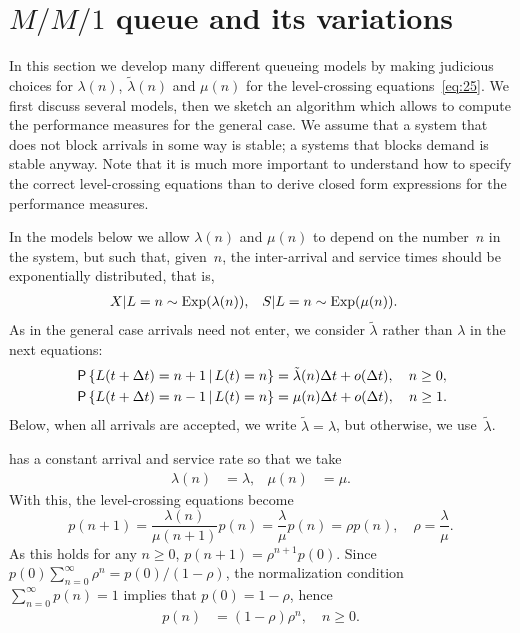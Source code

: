 \documentclass[stochastic-or.tex]{subfiles}
\begin{document}
\section{\texorpdfstring{$M/M/1$}{MM1} queue and its variations}
\label{sec:mm1}


In this section we develop many different queueing models by making judicious choices for $\lambda(n)$, $\tilde \lambda(n)$ and $\mu(n)$ for the level-crossing equations~\cref{eq:25}.
We first discuss several models, then we sketch an algorithm which allows to compute the performance measures for the general case.
We assume that a system that does not block arrivals in some way is stable; a systems that blocks demand is stable anyway.
Note that it is much more important to understand how to specify the correct level-crossing equations than to derive closed form expressions for the performance measures.

In the models below we allow $\lambda(n)$ and $\mu(n)$ to depend on the number~$n$ in the system, but such that, given~$n$, the inter-arrival and service times should be exponentially distributed, that is,
\begin{align*}
  X|L=n &\sim \mathrm{Exp}(\lambda(n)), & S|L=n &\sim \mathrm{Exp}(\mu(n)).
\end{align*}
As  in the general case arrivals need not enter, we consider $\tilde \lambda$ rather than $\lambda$ in the next equations:
\begin{align*}
  \,\mathsf{P}\left\{L(t+\Delta t) = n+1 \,\middle|\, L(t) = n \right\} &= \tilde \lambda(n) \Delta t + o(\Delta t), \quad n\geq 0,\\
  \,\mathsf{P}\left\{L(t+\Delta t) = n-1 \,\middle|\, L(t) = n \right\} &= \mu(n) \Delta t + o(\Delta t), \quad n \geq 1.
\end{align*}
Below, when all arrivals are accepted, we write $\tilde \lambda = \lambda$, but otherwise, we use~$\tilde \lambda$.


 has  a constant arrival and service rate so that we take
\begin{align*}
\lambda(n)&=\lambda, & \mu(n)&=\mu.
\end{align*}
With this, the level-crossing equations become
\begin{equation*}
 p(n+1) = \frac{\lambda(n)}{\mu(n+1)} p(n) = \frac{\lambda}{\mu} p(n) = \rho p(n),\quad \rho = \frac{\lambda}{\mu}.
\end{equation*}
As this holds for any $n\geq 0$, $p(n+1) = \rho^{n+1} p(0)$. Since $p(0) \sum_{n=0}^{\infty} \rho^{n} = p(0)/(1-\rho)$, the normalization condition $\sum_{n=0}^{\infty} p(n) = 1$ implies that $p(0) = 1-\rho$, hence
\begin{align}\label{eq:23}
p(n) &= (1-\rho)\rho^{n}, \quad n \geq 0.
\end{align}
\end{document}
